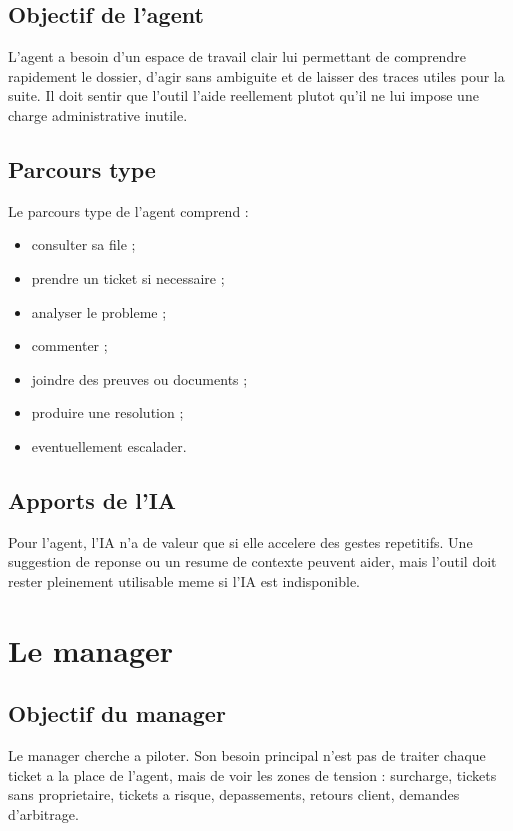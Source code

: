 \documentclass[12pt,a4paper,oneside]{report}
\begin{document}
\subsection{Objectif de l'agent}

L'agent a besoin d'un espace de travail clair lui permettant de comprendre rapidement le dossier, d'agir sans ambiguite et de laisser des traces utiles pour la suite. Il doit sentir que l'outil l'aide reellement plutot qu'il ne lui impose une charge administrative inutile.

\subsection{Parcours type}

Le parcours type de l'agent comprend :

\begin{itemize}[leftmargin=1.2cm]
  \item consulter sa file ;
  \item prendre un ticket si necessaire ;
  \item analyser le probleme ;
  \item commenter ;
  \item joindre des preuves ou documents ;
  \item produire une resolution ;
  \item eventuellement escalader.
\end{itemize}

\subsection{Apports de l'IA}

Pour l'agent, l'IA n'a de valeur que si elle accelere des gestes repetitifs. Une suggestion de reponse ou un resume de contexte peuvent aider, mais l'outil doit rester pleinement utilisable meme si l'IA est indisponible.

\section{Le manager}

\subsection{Objectif du manager}

Le manager cherche a piloter. Son besoin principal n'est pas de traiter chaque ticket a la place de l'agent, mais de voir les zones de tension : surcharge, tickets sans proprietaire, tickets a risque, depassements, retours client, demandes d'arbitrage.
\end{document}
